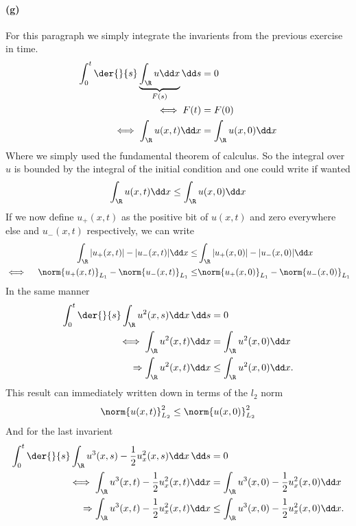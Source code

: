 \paragraph{(g)}
For this paragraph we simply integrate the invarients from the previous exercise in time. 
\begin{align}
\int_0^t \der{}{s}\underbrace{\int_\R u\dd x}_{F(s)}\dd s &= 0\\
\iff F(t) &= F(0)\\
\iff \int_\R u(x,t)\dd x&=\int_\R u(x,0) \dd x
\end{align}
Where we simply used the fundamental theorem of calculus. So the integral over $u$ is bounded by the integral of the initial condition and one could write if wanted
\begin{align}
\int_\R u(x,t)\dd x\leq\int_\R u(x,0) \dd x
\end{align}
If we now define $u_+(x,t)$ as the positive bit of $u(x,t)$ and zero everywhere else and $u_-(x,t)$ respectively, we can write 
\begin{align}
\int_\R |u_+(x,t)|-|u_-(x,t)|\dd x\leq&\int_\R  |u_+(x,0)|-|u_-(x,0)|\dd x\\
\iff \quad \norm{u_+(x,t)}_{L_1}-\norm{u_-(x,t)}_{L_1}\leq& \norm{u_+(x,0)}_{L_1}-\norm{u_-(x,0)}_{L_1}
\end{align}
In the same manner
\begin{align}
\int_0^t \der{}{s}\int_\R u^2(x,s)\dd x\, \dd s& =0\\
\iff \int_\R u^2(x,t)\dd x &= \int_\R u^2(x,0)\dd x \\
\Rightarrow \int_\R u^2(x,t)\dd x &\leq \int_\R u^2(x,0)\dd x .
\end{align}
This result can immediately written down in terms of the $l_2$ norm
\begin{align}
\norm{u(x,t)}^2_{L_2}\leq \norm{u(x,0)}^2_{L_2}
\end{align}
And for the last invarient
\begin{align}
\int_0^t \der{}{s}\int_\R u^3(x,s)-\frac 12 u_x^2(x,s)\dd x\, \dd s& =0\\
\iff \int_\R u^3(x,t)-\frac 12 u_x^2(x,t)\dd x &= \int_\R u^3(x,0)-\frac 12 u_x^2(x,0)\dd x \\
\Rightarrow \int_\R u^3(x,t)-\frac 12 u_x^2(x,t)\dd x &\leq \int_\R u^3(x,0)-\frac 12 u_x^2(x,0)\dd x.
\end{align}